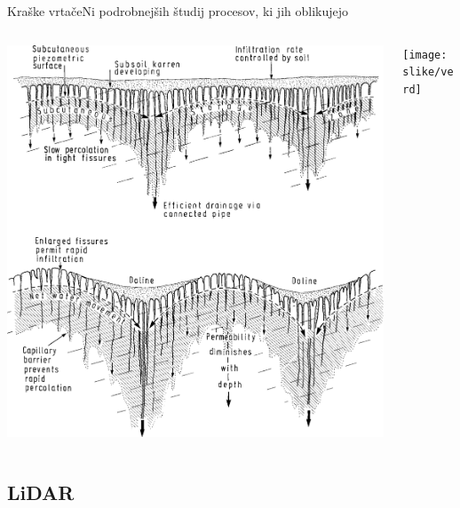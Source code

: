 \documentclass{beamer}
\begin{document}
\begin{frame}{Kraške vrtače}{Ni podrobnejših študij procesov, ki jih oblikujejo}

\begin{columns}
  \begin{column}{0.6\textwidth}
    \includegraphics[width=\textwidth]{slike/vrtaca-ford-williams.png}
  \end{column}

  \begin{column}{0.5\textwidth}
    \texttt{[image: slike/verd]}
  \end{column}
\end{columns}
\end{frame}


\subsection{LiDAR}

\end{document}
